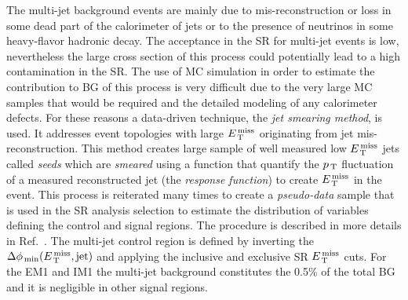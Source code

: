 The multi-jet background events are mainly due to mis-reconstruction or loss
in some dead part of the calorimeter of jets or to the presence of neutrinos in
some heavy-flavor hadronic decay. The acceptance in the SR for multi-jet
events is low, nevertheless the large cross section of this process could
potentially lead to a high contamination in the SR\@. The use of MC simulation
in order to estimate the contribution to BG of this process is very difficult
due to the very large MC samples that would be required and the detailed
modeling of any calorimeter defects. For these reasons a data-driven technique,
the \emph{jet smearing method}, is used. It addresses event topologies with
large $E_\mathrm{\, T}^\mathrm{\, miss}$ originating from jet mis-reconstruction. This method creates large
sample of well measured low $E_\mathrm{\, T}^\mathrm{\, miss}$ jets called \emph{seeds} which are
\emph{smeared} using a function that quantify the $p_\mathrm{\, T}$ fluctuation of a
measured reconstructed jet (the \emph{response function}) to create $E_\mathrm{\, T}^\mathrm{\, miss}$ in
the event. This process is reiterated many times to create a \emph{pseudo-data}
sample that is used in the SR analysis selection to estimate the distribution of
variables defining the control and signal regions. The procedure is described in
more details in Ref.~\cite{JetSmearing}. The multi-jet control region is defined
by inverting the $\Delta \phi_\mathrm{\, min} (E_\mathrm{\, T}^\mathrm{\, miss}, \mathrm{jet})$ and applying
the inclusive and exclusive SR $E_\mathrm{\, T}^\mathrm{\, miss}$ cuts. For the EM1 and IM1 the multi-jet
background constitutes the 0.5\% of the total BG and it is negligible in other
signal regions.
